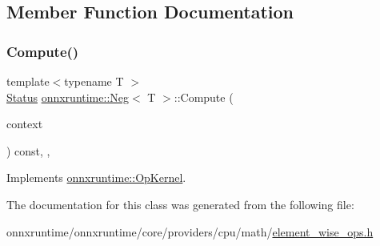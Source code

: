 \subsection{Member Function Documentation}
\mbox{\label{classonnxruntime_1_1Neg_ae7346a503f7b94f000778037e7a92c69}} 
\subsubsection{\texorpdfstring{Compute()}{Compute()}}
{\footnotesize\ttfamily template$<$typename T $>$ \\
\mbox{\hyperlink{classonnxruntime_1_1common_1_1Status}{Status}} \mbox{\hyperlink{classonnxruntime_1_1Neg}{onnxruntime\+::\+Neg}}$<$ T $>$\+::Compute (\begin{DoxyParamCaption}\item[{\mbox{\hyperlink{classonnxruntime_1_1OpKernelContext}{Op\+Kernel\+Context}} $\ast$}]{context }\end{DoxyParamCaption}) const\hspace{0.3cm}{\ttfamily [inline]}, {\ttfamily [override]}, {\ttfamily [virtual]}}



Implements \mbox{\hyperlink{classonnxruntime_1_1OpKernel_a9eca8656a78b1b3ab9d3351a12798650}{onnxruntime\+::\+Op\+Kernel}}.



The documentation for this class was generated from the following file\+:\begin{DoxyCompactItemize}
\item 
onnxruntime/onnxruntime/core/providers/cpu/math/\mbox{\hyperlink{element__wise__ops_8h}{element\+\_\+wise\+\_\+ops.\+h}}\end{DoxyCompactItemize}
